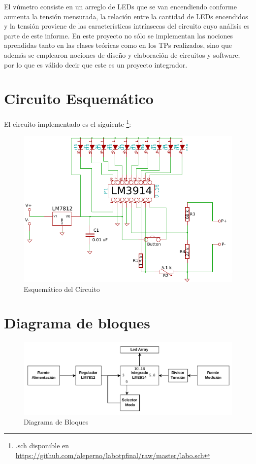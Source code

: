 \documentclass[12pt,a4paper]{article}
\begin{document}
		El vúmetro consiste en un arreglo de LEDs que se van encendiendo conforme aumenta la tensión mensurada, la relación entre la cantidad de LEDs encendidos y la tensión proviene de las características intrínsecas del circuito cuyo análisis es parte de este informe. En este proyecto no sólo se implementan las nociones aprendidas tanto en las clases teóricas  como en los TPs realizados, sino que además se emplearon nociones de diseño y elaboración de circuitos y software; por lo que es válido decir que este es un proyecto integrador.

	\newpage
	\section{Circuito Esquemático}
		El circuito implementado es el siguiente \footnote{.sch disponible en \url{https://github.com/aleperno/labotpfinal/raw/master/labo.sch}}:

		\begin{figure}[H]
			\centering
			\includegraphics[scale=1.2]{images/sch.pdf}\caption{Esquemático del Circuito}
			\label{fig:circesq}
		\end{figure}

	\section{Diagrama de bloques}

		\begin{figure}[H]
			\centering
			\includegraphics[scale=1.2]{images/bloque.pdf}\caption{Diagrama de Bloques}
			\label{fig:bloque}
		\end{figure}
\end{document}
